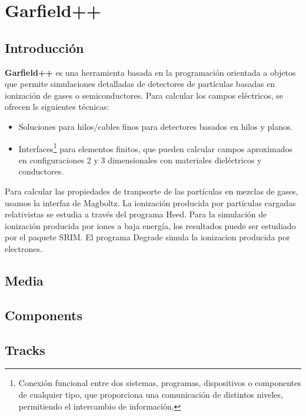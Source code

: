 \chapter{Garfield++}


\section{Introducción}

\textbf{Garfield++} es una herramienta basada en la programación orientada a objetos que permite simulaciones detalladas de detectores de partículas basadas en ionización de gases o semiconductores. Para calcular los campos eléctricos, se ofrecen ls siguientes técnicas: 

\begin{itemize}
    \item Soluciones para hilos/cables finos para detectores basados en hilos y planos. 
    \item Interfaces\footnote{Conexión funcional entre dos sistemas, programas, dispositivos o componentes de cualquier tipo, que proporciona una comunicación de distintos niveles, permitiendo el intercambio de información.} para elementos finitos, que pueden calcular campos aproximados en configuraciones 2 y 3 dimensionales con materiales dieléctricos y conductores. 
\end{itemize}
Para calcular las propiedades de tranpsorte de las partículas en mezclas de gases, usamos la interfaz de Magboltz. La ionización producida por partículas cargadas relativistas se estudia a través del programa Heed. Para la simulación de ionización producida por iones a baja energía, los resultados puede ser estudiado por el paquete SRIM. El programa Degrade simula la ionizacion producida por electrones. 




\section{Media}

\section{Components}

\section{Tracks}

